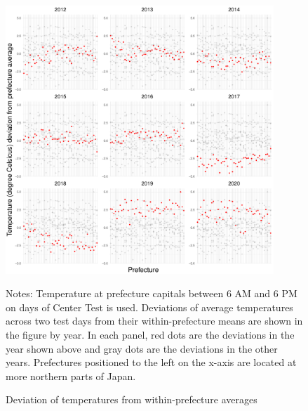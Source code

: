 \documentclass[12pt,letterpaper]{article}
\begin{document}
\begin{figure}[H]
  \centering
  \caption{Deviation of temperatures from within-prefecture averages}
  \includegraphics[width = 0.9\textwidth]{../Output/images/temperature_diff_by_year.pdf}
  \label{fig:temperature_diff_by_year}
  \footnotesize
  \begin{tablenotes}
    \item Notes:
      Temperature at prefecture capitals between 6 AM and 6 PM on days of Center Test is used.
      Deviations of average temperatures across two test days from their within-prefecture means are shown in the figure by year.
      In each panel, red dots are the deviations in the year shown above and gray dots are the deviations in the other years.
      Prefectures positioned to the left on the x-axis are located at more northern parts of Japan.
  \end{tablenotes}
\end{figure}
\end{document}
